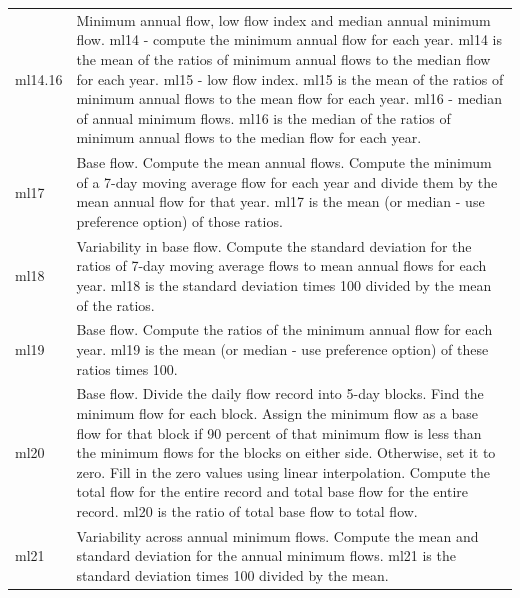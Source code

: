 \documentclass[a4paper,11pt]{article}\usepackage[]{graphicx}\usepackage[]{color}
\begin{document}
\begin{table}[ht]
\begin{threeparttable}[b]
\begin{tabularx}{\textwidth}{|l|X|}
  ml14.16 & Minimum annual flow, low flow index and median annual minimum flow. ml14 - compute the minimum annual flow for each year. ml14 is the mean of the ratios of minimum annual flows to the median flow for each year. ml15 - low flow index. ml15 is the mean of the ratios of minimum annual flows to the mean flow for each year. ml16 - median of annual minimum flows. ml16 is the median of the ratios of minimum annual flows to the median flow for each year. \\ 
  ml17 & Base flow. Compute the mean annual flows. Compute the minimum of a 7-day moving average flow for each year and divide them by the mean annual flow for that year. ml17 is the mean (or median - use preference option) of those ratios. \\
  ml18 & Variability in base flow. Compute the standard deviation for the ratios of 7-day moving average flows to mean annual flows for each year. ml18 is the standard deviation times 100 divided by the mean of the ratios. \\
  ml19 & Base flow. Compute the ratios of the minimum annual flow for each year. ml19 is the mean (or median - use preference option) of these ratios times 100. \\
  ml20 & Base flow. Divide the daily flow record into 5-day blocks. Find the minimum flow for each block. Assign the minimum flow as a base flow for that block if 90 percent of that minimum flow is less than the minimum flows for the blocks on either side. Otherwise, set it to zero. Fill in the zero values using linear interpolation. Compute the total flow for the entire record and total base flow for the entire record. ml20 is the ratio of total base flow to total flow. \\
  ml21 & Variability across annual minimum flows. Compute the mean and standard deviation for the annual minimum flows. ml21 is the standard deviation times 100 divided by the mean. \\
    \hline
  \end{tabularx}
  \end{threeparttable}
\end{table}
\end{document}
